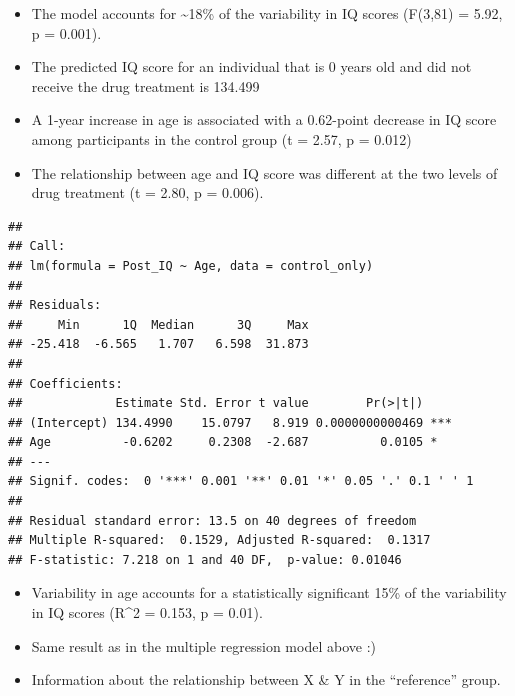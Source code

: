 \documentclass[
]{book}
\newenvironment{Shaded}{\begin{snugshade}}{\end{snugshade}}
\newcommand{\AttributeTok}[1]{\textcolor[rgb]{0.13,0.29,0.53}{#1}}
\newcommand{\CommentTok}[1]{\textcolor[rgb]{0.56,0.35,0.01}{\textit{#1}}}
\newcommand{\DocumentationTok}[1]{\textcolor[rgb]{0.56,0.35,0.01}{\textbf{\textit{#1}}}}
\newcommand{\FunctionTok}[1]{\textcolor[rgb]{0.13,0.29,0.53}{\textbf{#1}}}
\newcommand{\NormalTok}[1]{#1}
\newcommand{\OtherTok}[1]{\textcolor[rgb]{0.56,0.35,0.01}{#1}}
\newcommand{\SpecialCharTok}[1]{\textcolor[rgb]{0.81,0.36,0.00}{\textbf{#1}}}
\newcommand{\StringTok}[1]{\textcolor[rgb]{0.31,0.60,0.02}{#1}}
\providecommand{\tightlist}{%
  \setlength{\itemsep}{0pt}\setlength{\parskip}{0pt}}
\begin{document}
\begin{itemize}
\tightlist
\item
  The model accounts for \textasciitilde18\% of the variability in IQ scores (F(3,81) = 5.92, p = 0.001).
\item
  The predicted IQ score for an individual that is 0 years old and did not receive the drug treatment is 134.499
\item
  A 1-year increase in age is associated with a 0.62-point decrease in IQ score among participants in the control group (t = 2.57, p = 0.012)
\item
  The relationship between age and IQ score was different at the two levels of drug treatment (t = 2.80, p = 0.006).
\end{itemize}

\begin{Shaded}
\end{Shaded}

\begin{verbatim}
## 
## Call:
## lm(formula = Post_IQ ~ Age, data = control_only)
## 
## Residuals:
##     Min      1Q  Median      3Q     Max 
## -25.418  -6.565   1.707   6.598  31.873 
## 
## Coefficients:
##             Estimate Std. Error t value        Pr(>|t|)    
## (Intercept) 134.4990    15.0797   8.919 0.0000000000469 ***
## Age          -0.6202     0.2308  -2.687          0.0105 *  
## ---
## Signif. codes:  0 '***' 0.001 '**' 0.01 '*' 0.05 '.' 0.1 ' ' 1
## 
## Residual standard error: 13.5 on 40 degrees of freedom
## Multiple R-squared:  0.1529, Adjusted R-squared:  0.1317 
## F-statistic: 7.218 on 1 and 40 DF,  p-value: 0.01046
\end{verbatim}

\begin{itemize}
\tightlist
\item
  Variability in age accounts for a statistically significant 15\% of the variability in IQ scores (R\^{}2 = 0.153, p = 0.01).
\item
  Same result as in the multiple regression model above :)
\item
  Information about the relationship between X \& Y in the ``reference'' group.
\end{itemize}
\end{document}
